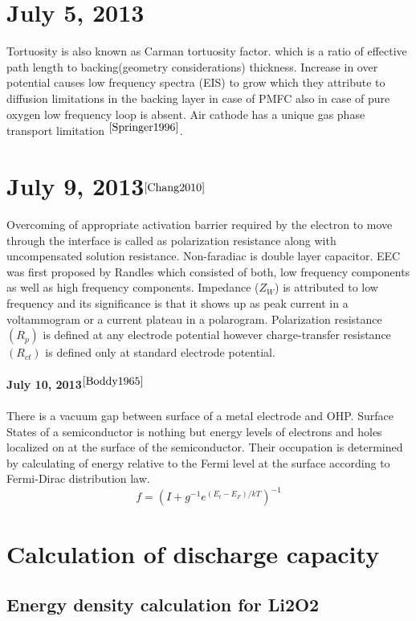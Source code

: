 \documentclass[12pt]{book}
\begin{document}
\section*{July 5, 2013}
Tortuosity is also known as Carman tortuosity factor. which is a ratio of effective path length to backing(geometry considerations) thickness.
Increase in over potential causes low frequency spectra (EIS) to grow which they attribute to diffusion limitations in the backing layer in case of PMFC also in case of pure oxygen low frequency loop is absent. Air cathode has a unique gas phase transport limitation $^{\cite{Springer1996}}$.

\section*{July 9, 2013$^{\cite{Chang2010}}$ }
Overcoming of appropriate activation barrier required by the electron to move through the interface is called as polarization resistance along with uncompensated solution resistance. Non-faradiac is double layer capacitor. 
EEC was first proposed by Randles which consisted of both, low frequency components as well as high frequency components.
Impedance ($Z_W$) is attributed to low frequency and its significance is that it shows up as peak current in a voltammogram or a current plateau in a polarogram.
Polarization resistance$(R_p)$ is defined at any electrode potential however charge-transfer resistance $(R_{ct})$	 is defined only at standard electrode potential.

\paragraph{July 10, 2013$^{\cite{Boddy1965}}$}
There is a vacuum gap between surface of a metal electrode and OHP. Surface States of a semiconductor is nothing but energy levels of electrons and holes localized on at the surface of the semiconductor. Their occupation is determined by calculating of energy relative to the Fermi level at the surface according to Fermi-Dirac distribution law.
\begin{equation}
f=(I+g^{-1}e^{(E_t-E_F)/kT})^{-1}
\end{equation}

\section{Calculation of discharge capacity}
\subsection{Energy density calculation for Li2O2}
\end{document}
